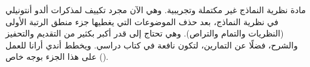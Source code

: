 \documentclass[../../include/open-logic-part]{subfiles}
\begin{document}

\begin{editorial}
  مادة نظرية النماذج غير مكتملة وتجريبية. وهي الآن مجرد تكييف لمذكرات
  ألدو أنتونيلي في نظرية النماذج، بعد حذف الموضوعات التي يغطيها جزء
  منطق الرتبة الأولى (النظريات والتمام والتراص). وهي تحتاج إلى قدر
  أكبر بكثير من التقديم والتحفيز والشرح، فضلًا عن التمارين، لتكون
  نافعة في كتاب دراسي. ويخطط أندي أرانا للعمل على هذا الجزء بوجه خاص
  ().
\end{editorial}





\OLEndPartHook
\end{document}
